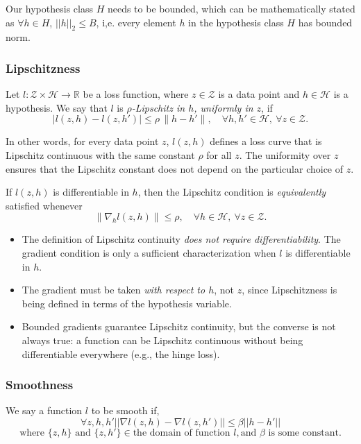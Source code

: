 \documentclass[11pt]{article}
\theoremstyle{plain}
\begin{document}
Our hypothesis class $H$ needs to be bounded, which can be mathematically stated as $\forall h \in H$, $\lvert\lvert h \rvert\rvert_2 \leq B$, i,e. every element 
$h$ in the hypothesis class $H$ has bounded norm.


\subsubsection{Lipschitzness}\label{sec:Lipschitzness}
Let $l : \mathcal{Z} \times \mathcal{H} \to \mathbb{R}$ be a loss function, where $z \in \mathcal{Z}$ is a data point and $h \in \mathcal{H}$ is a hypothesis.  
We say that $l$ is \emph{$\rho$-Lipschitz in $h$, uniformly in $z$}, if  
\[
    |l(z,h) - l(z,h')| \leq \rho \, \|h - h'\|, 
    \quad \forall h,h' \in \mathcal{H}, \ \forall z \in \mathcal{Z}.
\]

In other words, for every data point $z$, $l(z,h)$ defines a loss curve that is Lipschitz continuous with the same constant $\rho$ for all $z$. 
The uniformity over $z$ ensures that the Lipschitz constant does not depend on the particular choice of $z$.

If $l(z,h)$ is differentiable in $h$, then the Lipschitz condition is \emph{equivalently} satisfied whenever
\[   
    \|\nabla_h l(z,h)\| \leq \rho, 
    \quad \forall h \in \mathcal{H}, \ \forall z \in \mathcal{Z}.
\]
\begin{itemize}
    \item The definition of Lipschitz continuity \emph{does not require differentiability}. 
          The gradient condition is only a sufficient characterization when $l$ is differentiable in $h$. 
    \item The gradient must be taken \emph{with respect to $h$}, not $z$, since Lipschitzness is being defined in terms of the hypothesis variable. 
    \item Bounded gradients guarantee Lipschitz continuity, but the converse is not always true: 
          a function can be Lipschitz continuous without being differentiable everywhere (e.g., the hinge loss). 
\end{itemize}


\subsubsection{Smoothness}\label{sec:Smoothness}
We say a function $l$ to be smooth if,
\[
\forall z,h,h' \lvert\lvert \nabla l(z,h) - \nabla l(z,h')\rvert\rvert \leq \beta\lvert\lvert h-h'\rvert\rvert 
\]
\[
\text{where } \{z,h\} \text{ and } \{z, h'\} \in \text{the domain of function }l, \text{and } \beta \text{ is some constant}.
\]
\end{document}
